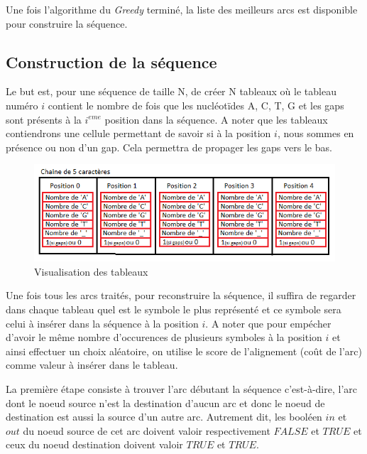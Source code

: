 \documentclass[12pt,a4paper,final]{article}
\begin{document}
Une fois l'algorithme du \textit{Greedy} terminé, la liste des meilleurs arcs est disponible pour construire la séquence.

\subsection{Construction de la séquence}

Le but est, pour une séquence de taille N, de créer N tableaux où le tableau numéro $i$ contient le nombre de fois que les nucléotïdes A, C, T, G et les gaps sont présents à la $i^{eme}$ position dans la séquence. A noter que les tableaux contiendrons une cellule permettant de savoir si à la position $i$, nous sommes en présence ou non d'un gap.  Cela permettra de propager les gaps vers le bas.\medskip

\begin{figure}[!ht]
\centering
	\includegraphics[width=1\textwidth]{images/table.png}
	\caption{\label{table}Visualisation des tableaux}
\end{figure}

Une fois tous les arcs traités, pour reconstruire la séquence, il suffira de regarder dans chaque tableau quel est le symbole le plus représenté et ce symbole sera celui à insérer dans la séquence à la position $i$.  A noter que pour empécher d'avoir le même nombre d'occurences de plusieurs symboles à la position $i$ et ainsi effectuer un choix aléatoire, on utilise le score de l'alignement (coût de l'arc) comme valeur à insérer dans le tableau.\medskip

La première étape consiste à trouver l'arc débutant la séquence c'est-à-dire, l'arc dont le noeud source n'est la destination d'aucun arc et donc le noeud de destination est aussi la source d'un autre arc.%
Autrement dit, les booléen $in$ et $out$ du noeud source de cet arc doivent valoir respectivement $FALSE$ et $TRUE$  et ceux du noeud destination doivent valoir $TRUE$ et $TRUE$.\medskip
\end{document}
